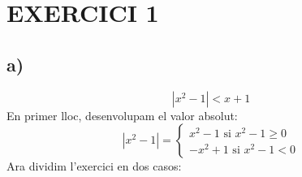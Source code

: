 \section*{EXERCICI 1}
\subsection*{a)}
\begin{equation*}
|x^2-1| < x+1
\end{equation*}
En primer lloc, desenvolupam el valor absolut:
\begin{equation*}
|x^2-1| =\left\lbrace\begin{array}{cc} x^2 - 1\text{  si  } x^2 -1\geq0 \\
-x^2 +1\text{  si  } x^2 -1<0 
\end{array}\right.
\end{equation*}
Ara dividim l'exercici en dos casos:
